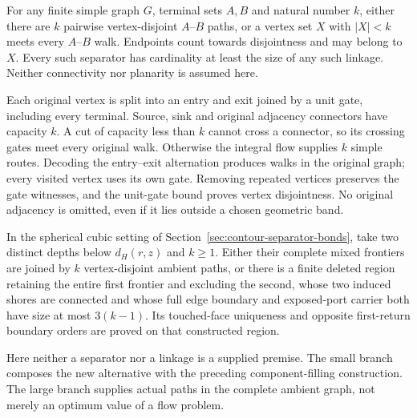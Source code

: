 \begin{theorem}
For any finite simple graph $G$, terminal sets $A,B$ and natural number
$k$, either there are $k$ pairwise vertex-disjoint $A$--$B$ paths, or a
vertex set $X$ with $|X|<k$ meets every $A$--$B$ walk.  Endpoints count
towards disjointness and may belong to $X$.  Every such separator has
cardinality at least the size of any such linkage.  Neither connectivity
nor planarity is assumed here.
\end{theorem}

Each original vertex is split into an entry and exit joined by a unit
gate, including every terminal.  Source, sink and original adjacency
connectors have capacity $k$.  A cut of capacity less than $k$ cannot
cross a connector, so its crossing gates meet every original walk.
Otherwise the integral flow supplies $k$ simple routes.  Decoding the
entry--exit alternation produces walks in the original graph; every
visited vertex uses its own gate.  Removing repeated vertices preserves
the gate witnesses, and the unit-gate bound proves vertex disjointness.
No original adjacency is omitted, even if it lies outside a chosen
geometric band.

\begin{theorem}
In the spherical cubic setting of Section~\ref{sec:contour-separator-bonds},
take two distinct depths below $d_H(r,z)$ and $k\ge1$.  Either their
complete mixed frontiers are joined by $k$ vertex-disjoint ambient paths,
or there is a finite deleted region retaining the entire first frontier
and excluding the second, whose two induced shores are connected and
whose full edge boundary and exposed-port carrier both have size at most
$3(k-1)$.  Its touched-face uniqueness and opposite first-return boundary
orders are proved on that constructed region.
\end{theorem}

Here neither a separator nor a linkage is a supplied premise.  The small
branch composes the new alternative with the preceding component-filling
construction.  The large branch supplies actual paths in the complete
ambient graph, not merely an optimum value of a flow problem.

